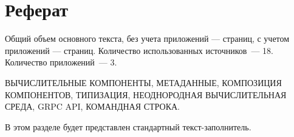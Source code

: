 \chapter*{Реферат}
\thispagestyle{plain}

Общий объем основного текста, без учета приложений ---
\pageref{end_of_main_text} страниц, с учетом приложений ---
\pageref{end_of_document} страниц. Количество использованных источников~--- 18.
Количество приложений~--- 3.

\noindent \uppercase{вычислительные компоненты, метаданные, композиция компонентов, типизация, неоднородная вычислительная среда, grpc api, командная строка.}

В этом разделе будет представлен стандартный текст-заполнитель.

